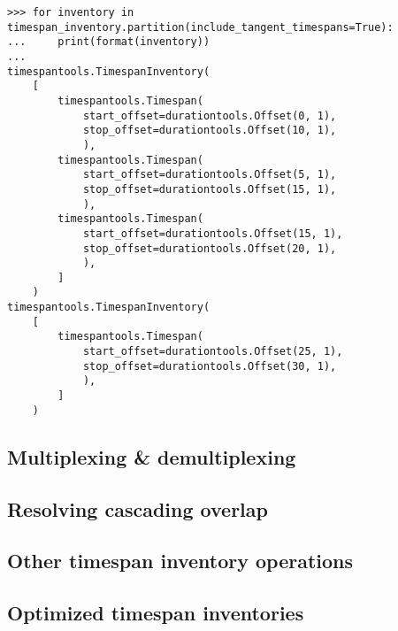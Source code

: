 \begin{comment}
<abjad>
for inventory in timespan_inventory.partition(include_tangent_timespans=True):
    print(format(inventory))

</abjad>
\end{comment}

\begin{singlespacing}
\vspace{-0.5\baselineskip}
\begin{lstlisting}
>>> for inventory in timespan_inventory.partition(include_tangent_timespans=True):
...     print(format(inventory))
...
timespantools.TimespanInventory(
    [
        timespantools.Timespan(
            start_offset=durationtools.Offset(0, 1),
            stop_offset=durationtools.Offset(10, 1),
            ),
        timespantools.Timespan(
            start_offset=durationtools.Offset(5, 1),
            stop_offset=durationtools.Offset(15, 1),
            ),
        timespantools.Timespan(
            start_offset=durationtools.Offset(15, 1),
            stop_offset=durationtools.Offset(20, 1),
            ),
        ]
    )
timespantools.TimespanInventory(
    [
        timespantools.Timespan(
            start_offset=durationtools.Offset(25, 1),
            stop_offset=durationtools.Offset(30, 1),
            ),
        ]
    )
\end{lstlisting}
\end{singlespacing}

\subsection{Multiplexing \& demultiplexing}

\subsection{Resolving cascading overlap}

\subsection{Other timespan inventory operations}

\begin{comment}
TimespanInventory.clip_timespan_durations
TimespanInventory.count_offsets()
TimespanInventory.explode()
TimespanInventory.round_offsets()
\end{comment}

\subsection{Optimized timespan inventories}

